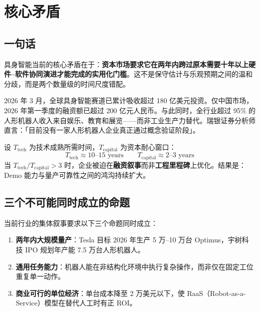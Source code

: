 \chapter{核心矛盾}
\label{ch:contradiction}

\section{一句话}

具身智能当前的核心矛盾在于：\textbf{资本市场要求它在两年内跨过原本需要十年以上硬件--软件协同演进才能完成的实用化门槛}。这不是保守估计与乐观预期之间的温和分歧，而是两个数量级的时间尺度错配。

2026 年 3 月，全球具身智能赛道已累计吸收超过 180 亿美元投资\cite{humanoidintel2026}。仅中国市场，2026 年第一季度的融资额已超过 200 亿元人民币\cite{kaiyuan2026q1}。与此同时，全行业超过 95\% 的人形机器人收入来自娱乐、教育和展览——而非工业生产力替代\cite{idc2025humanoid}。瑞银证券分析师直言：「目前没有一家人形机器人企业真正通过概念验证阶段」\cite{ubs2026humanoid}。

\begin{corebox}[矛盾的数学表达]
设 $T_{\text{tech}}$ 为技术成熟所需时间，$T_{\text{capital}}$ 为资本耐心窗口：
\[
T_{\text{tech}} \approx 10\text{--}15 \text{ years} \qquad T_{\text{capital}} \approx 2\text{--}3 \text{ years}
\]
当 $T_{\text{tech}} / T_{\text{capital}} > 3$ 时，企业被迫在\textbf{融资叙事}而非\textbf{工程里程碑}上优化。结果是：Demo 能力与量产可靠性之间的鸿沟持续扩大。
\end{corebox}

\section{三个不可能同时成立的命题}

当前行业的集体叙事要求以下三个命题同时成立：

\begin{enumerate}
  \item \textbf{两年内大规模量产}：Tesla 目标 2026 年生产 5 万--10 万台 Optimus\cite{musk2026abundance}，宇树科技 IPO 规划年产能 7.5 万台人形机器人\cite{unitree2026ipo}。
  \item \textbf{通用任务能力}：机器人能在非结构化环境中执行复杂操作，而非仅在固定工位重复单一动作。
  \item \textbf{商业可行的单位经济}：单台成本降至 2 万美元以下，使 RaaS（Robot-as-a-Service）模型在替代人工时有正 ROI\cite{bofa2026humanoid}。
\end{enumerate}


